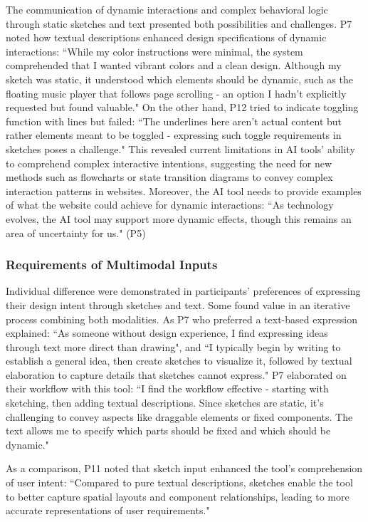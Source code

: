 The communication of dynamic interactions and complex behavioral logic through static sketches and text presented both possibilities and challenges. P7 noted how textual descriptions enhanced design specifications of dynamic interactions: ``While my color instructions were minimal, the system comprehended that I wanted vibrant colors and a clean design. Although my sketch was static, it understood which elements should be dynamic, such as the floating music player that follows page scrolling - an option I hadn't explicitly requested but found valuable." On the other hand, P12 tried to indicate toggling function with lines but failed: ``The underlines here aren't actual content but rather elements meant to be toggled - expressing such toggle requirements in sketches poses a challenge." This revealed current limitations in AI tools' ability to comprehend complex interactive intentions, suggesting the need for new methods such as flowcharts or state transition diagrams to convey complex interaction patterns in websites. Moreover, the AI tool needs to provide examples of what the website could achieve for dynamic interactions: ``As technology evolves, the AI tool may support more dynamic effects, though this remains an area of uncertainty for us." (P5)

\subsubsection{Requirements of Multimodal Inputs}

Individual difference were demonstrated in participants' preferences of expressing their design intent through sketches and text. Some found value in an iterative process combining both modalities. As P7 who preferred a text-based expression explained: ``As someone without design experience, I find expressing ideas through text more direct than drawing", and ``I typically begin by writing to establish a general idea, then create sketches to visualize it, followed by textual elaboration to capture details that sketches cannot express." P7 elaborated on their workflow with this tool: ``I find the workflow effective - starting with sketching, then adding textual descriptions. Since sketches are static, it's challenging to convey aspects like draggable elements or fixed components. The text allows me to specify which parts should be fixed and which should be dynamic."

As a comparison, P11 noted that sketch input enhanced the tool's comprehension of user intent: ``Compared to pure textual descriptions, sketches enable the tool to better capture spatial layouts and component relationships, leading to more accurate representations of user requirements."

